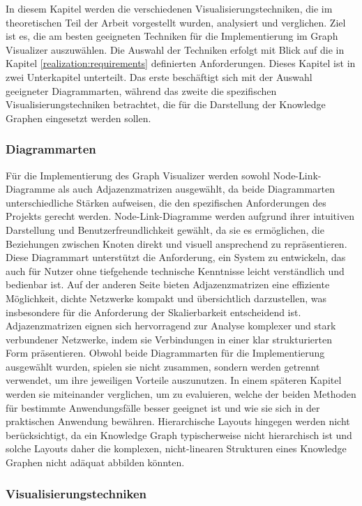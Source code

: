 In diesem Kapitel werden die verschiedenen Visualisierungstechniken, die im theoretischen Teil der Arbeit vorgestellt wurden, analysiert und verglichen. Ziel ist es, die am besten geeigneten Techniken für die Implementierung im Graph Visualizer auszuwählen. Die Auswahl der Techniken erfolgt mit Blick auf die in Kapitel \ref{realization:requirements} definierten Anforderungen. Dieses Kapitel ist in zwei Unterkapitel unterteilt. Das erste beschäftigt sich mit der Auswahl geeigneter Diagrammarten, während das zweite die spezifischen Visualisierungstechniken betrachtet, die für die Darstellung der Knowledge Graphen eingesetzt werden sollen.

\subsubsection{Diagrammarten}

Für die Implementierung des Graph Visualizer werden sowohl Node-Link-Diagramme als auch Adjazenzmatrizen ausgewählt, da beide Diagrammarten unterschiedliche Stärken aufweisen, die den spezifischen Anforderungen des Projekts gerecht werden. Node-Link-Diagramme werden aufgrund ihrer intuitiven Darstellung und Benutzerfreundlichkeit gewählt, da sie es ermöglichen, die Beziehungen zwischen Knoten direkt und visuell ansprechend zu repräsentieren. Diese Diagrammart unterstützt die Anforderung, ein System zu entwickeln, das auch für Nutzer ohne tiefgehende technische Kenntnisse leicht verständlich und bedienbar ist. Auf der anderen Seite bieten Adjazenzmatrizen eine effiziente Möglichkeit, dichte Netzwerke kompakt und übersichtlich darzustellen, was insbesondere für die Anforderung der Skalierbarkeit entscheidend ist. Adjazenzmatrizen eignen sich hervorragend zur Analyse komplexer und stark verbundener Netzwerke, indem sie Verbindungen in einer klar strukturierten Form präsentieren. Obwohl beide Diagrammarten für die Implementierung ausgewählt wurden, spielen sie nicht zusammen, sondern werden getrennt verwendet, um ihre jeweiligen Vorteile auszunutzen. In einem späteren Kapitel werden sie miteinander verglichen, um zu evaluieren, welche der beiden Methoden für bestimmte Anwendungsfälle besser geeignet ist und wie sie sich in der praktischen Anwendung bewähren. Hierarchische Layouts hingegen werden nicht berücksichtigt, da ein Knowledge Graph typischerweise nicht hierarchisch ist und solche Layouts daher die komplexen, nicht-linearen Strukturen eines Knowledge Graphen nicht adäquat abbilden könnten.

\subsubsection{Visualisierungstechniken}

